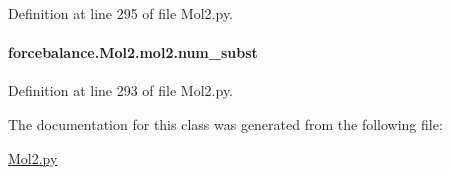 Definition at line 295 of file Mol2.\-py.

\hypertarget{classforcebalance_1_1Mol2_1_1mol2_ad4d5d6e9ac482b18da6dcfd13fa207fc}{
\paragraph[{num\-\_\-subst}]{\setlength{\rightskip}{0pt plus 5cm}forcebalance.\-Mol2.\-mol2.\-num\-\_\-subst}}\label{classforcebalance_1_1Mol2_1_1mol2_ad4d5d6e9ac482b18da6dcfd13fa207fc}


Definition at line 293 of file Mol2.\-py.



The documentation for this class was generated from the following file\-:\begin{DoxyCompactItemize}
\item 
\hyperlink{Mol2_8py}{Mol2.\-py}\end{DoxyCompactItemize}
